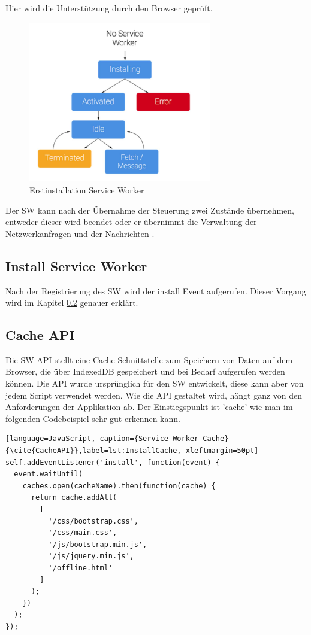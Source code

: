 Hier wird die Unterstützung durch den Browser geprüft.


\begin{figure}[h]
	\centering
	\includegraphics[width=8cm]{BilderAllgemein/InstallSW}\medskip
	\caption{Erstinstallation Service Worker \cite{ServiceWorkerRegistration}}
	\label{fig:Erstinstallation}
\end{figure}

Der \acs{SW} kann nach der Übernahme der Steuerung zwei Zustände übernehmen, entweder dieser wird beendet oder er übernimmt die Verwaltung der Netzwerkanfragen und der Nachrichten \cite{ServiceWorkerRegistration}.

\subsection{Install Service Worker}
Nach der Registrierung des \acs{SW} wird der install Event aufgerufen. Dieser Vorgang wird im 
Kapitel \ref{chap:CacheAPI} genauer erklärt.

\subsection{Cache API}\label{chap:CacheAPI}
Die \acs{SW} API stellt eine Cache-Schnittstelle zum Speichern von Daten auf dem Browser, die über IndexedDB \cite{IndexDB} gespeichert und bei Bedarf aufgerufen werden können. Die API wurde ursprünglich für den \acs{SW} entwickelt, diese kann aber von jedem Script verwendet werden. 
Wie die API gestaltet wird, hängt ganz von den Anforderungen der Applikation ab.
Der Einstiegspunkt ist 'cache' wie man im folgenden Codebeispiel sehr gut erkennen kann.

\begin{lstlisting}[language=JavaScript, caption={Service Worker Cache} {\cite{CacheAPI}},label=lst:InstallCache, xleftmargin=50pt]
self.addEventListener('install', function(event) {
  event.waitUntil(
    caches.open(cacheName).then(function(cache) {
      return cache.addAll(
        [
          '/css/bootstrap.css',
          '/css/main.css',
          '/js/bootstrap.min.js',
          '/js/jquery.min.js',
          '/offline.html'
        ]
      );
    })
  );
});
\end{lstlisting}

